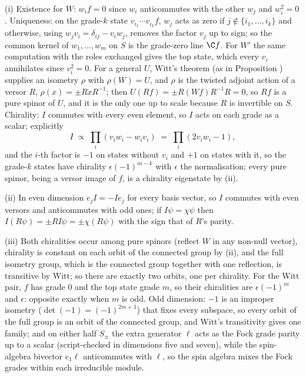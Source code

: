 (i) Existence for $W$: $w_{i}f = 0$ since $w_{i}$ anticommutes with the other $w_{j}$ and $w_{i}^{2} = 0$. Uniqueness: on the grade-$k$ state $v_{i_{1}}\cdots v_{i_{k}}f$, $w_{j}$ acts as zero if $j \notin \{i_{1}, \ldots, i_{k}\}$ and otherwise, using $w_{j}v_{i} = \delta_{ij} - v_{i}w_{j}$, removes the factor $v_{j}$ up to sign; so the common kernel of $w_{1}, \ldots, w_{m}$ on $S$ is the grade-zero line $\C f$. For $W'$ the same computation with the roles exchanged gives the top state, which every $v_{i}$ annihilates since $v_{i}^{2} = 0$. For a general $U$, Witt's theorem (as in Proposition ) supplies an isometry $\rho$ with $\rho(W) = U$, and $\rho$ is the twisted adjoint action of a versor $R$, $\rho(x) = \pm RxR^{-1}$; then $U(Rf) = \pm R(Wf)R^{-1}R = 0$, so $Rf$ is a pure spinor of $U$, and it is the only one up to scale because $R$ is invertible on $S$. Chirality: $I$ commutes with every even element, so $I$ acts on each grade as a scalar; explicitly
\[
I \;\propto\; \prod_{i}(v_{i}w_{i} - w_{i}v_{i}) \;=\; \prod_{i}(2v_{i}w_{i} - 1),
\]
and the $i$-th factor is $-1$ on states without $v_{i}$ and $+1$ on states with it, so the grade-$k$ states have chirality $\epsilon(-1)^{m-k}$ with $\epsilon$ the normalisation; every pure spinor, being a versor image of $f$, is a chirality eigenstate by (ii).

(ii) In even dimension $e_{j}I = -Ie_{j}$ for every basis vector, so $I$ commutes with even versors and anticommutes with odd ones; if $I\psi = \chi\psi$ then $I(R\psi) = \pm R I\psi = \pm\chi(R\psi)$ with the sign that of $R$'s parity.

(iii) Both chiralities occur among pure spinors (reflect $W$ in any non-null vector), chirality is constant on each orbit of the connected group by (ii), and the full isometry group, which is the connected group together with one reflection, is transitive by Witt; so there are exactly two orbits, one per chirality. For the Witt pair, $f$ has grade $0$ and the top state grade $m$, so their chiralities are $\epsilon(-1)^{m}$ and $\epsilon$: opposite exactly when $m$ is odd. Odd dimension: $-1$ is an improper isometry ($\det(-1) = (-1)^{2m+1}$) that fixes every subspace, so every orbit of the full group is an orbit of the connected group, and Witt's transitivity gives one family; and on either half $S_{\pm}$ the extra generator $\ell$ acts as the Fock grade parity up to a scalar (script-checked in dimensions five and seven), while the spin-algebra bivector $e_{1}\ell$ anticommutes with $\ell$, so the spin algebra mixes the Fock grades within each irreducible module.

